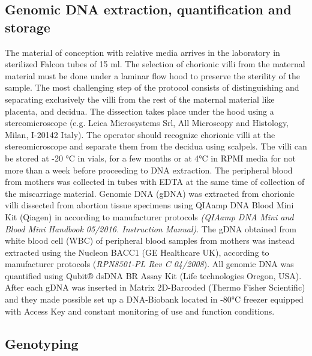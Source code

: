 \documentclass[journal,article,submit,moreauthors,pdftex]{Definitions/mdpi}
\begin{document}
\subsection{Genomic DNA extraction, quantification and storage}
\noindent The material of conception with relative media arrives in the laboratory in sterilized Falcon tubes of 15 ml. The selection of chorionic villi from the maternal material must be done under a laminar flow hood to preserve the sterility of the sample. The most challenging step of the protocol consists of distinguishing and separating exclusively the villi from the rest of the maternal material like placenta, and decidua. The dissection takes place under the hood using a stereomicroscope (e.g. Leica Microsystems Srl, All Microscopy and Histology, Milan, I-20142 Italy).  The operator should recognize chorionic villi at the stereomicroscope and separate them from the decidua using scalpels. The villi can be stored at -20 \si{\degree}C in vials, for a few months or at 4\si{\degree}C in RPMI media for not more than a week before proceeding to DNA extraction. The peripheral blood from mothers was collected in tubes with EDTA at the same time of collection of the miscarriage material. Genomic DNA (gDNA) was extracted from chorionic villi dissected from abortion tissue specimens using QIAamp DNA Blood Mini Kit (Qiagen) in according to manufacturer protocols \textit{(QIAamp DNA Mini and Blood Mini Handbook 05/2016. Instruction Manual)}. The gDNA obtained from white blood cell (WBC) of peripheral blood samples from mothers was instead extracted using the Nucleon BACC1 (GE Healthcare UK), according to manufacturer protocols (\textit{RPN8501-PL Rev C 04/2008}). All genomic DNA was quantified using Qubit® dsDNA BR Assay Kit (Life technologies Oregon, USA). After each gDNA was inserted in Matrix 2D-Barcoded (Thermo Fisher Scientific) and they made possible set up a DNA-Biobank located in -80\si{\degree}C freezer equipped with Access Key and constant monitoring of use and function conditions. %

\subsection{Genotyping}
\end{document}

